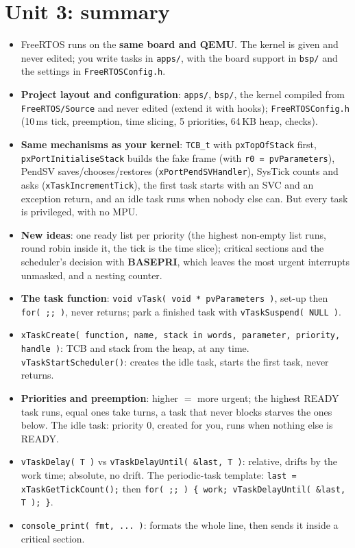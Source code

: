 \section{Unit 3: summary}
\begin{itemize}
    \item FreeRTOS runs on the \textbf{same board and QEMU}. The kernel is given and never edited; you write tasks in \texttt{apps/}, with the board support in \texttt{bsp/} and the settings in \texttt{FreeRTOSConfig.h}.
    \item \textbf{Project layout and configuration}: \texttt{apps/}, \texttt{bsp/}, the kernel compiled from \texttt{FreeRTOS/Source} and never edited (extend it with hooks); \texttt{FreeRTOSConfig.h} (10\,ms tick, preemption, time slicing, 5 priorities, 64\,KB heap, checks).
    \item \textbf{Same mechanisms as your kernel}: \texttt{TCB\_t} with \texttt{pxTopOfStack} first, \texttt{pxPortInitialiseStack} builds the fake frame (with \texttt{r0 = pvParameters}), PendSV saves/chooses/restores (\texttt{xPortPendSVHandler}), SysTick counts and asks (\texttt{xTaskIncrementTick}), the first task starts with an SVC and an exception return, and an idle task runs when nobody else can. But every task is privileged, with no MPU.
    \item \textbf{New ideas}: one ready list per priority (the highest non-empty list runs, round robin inside it, the tick is the time slice); critical sections and the scheduler's decision with \textbf{BASEPRI}, which leaves the most urgent interrupts unmasked, and a nesting counter.
    \item \textbf{The task function}: \texttt{void vTask( void * pvParameters )}, set-up then \texttt{for( ;; )}, never returns; park a finished task with \texttt{vTaskSuspend( NULL )}.
    \item \texttt{xTaskCreate( function, name, stack in words, parameter, priority, handle )}: TCB and stack from the heap, at any time. \texttt{vTaskStartScheduler()}: creates the idle task, starts the first task, never returns.
    \item \textbf{Priorities and preemption}: higher $=$ more urgent; the highest READY task runs, equal ones take turns, a task that never blocks starves the ones below. The idle task: priority 0, created for you, runs when nothing else is READY.
    \item \texttt{vTaskDelay( T )} vs \texttt{vTaskDelayUntil( \&last, T )}: relative, drifts by the work time; absolute, no drift. The periodic-task template: \texttt{last = xTaskGetTickCount();} then \texttt{for( ;; ) \{ work; vTaskDelayUntil( \&last, T ); \}}.
    \item \texttt{console\_print( fmt, ... )}: formats the whole line, then sends it inside a critical section.
\end{itemize}

